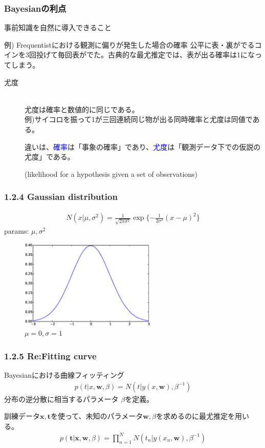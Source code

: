\documentclass[dvipdfmx]{beamer}
\theoremstyle{definition}
\begin{document}
\begin{frame}
  \frametitle{Bayesianの利点}
  事前知識を自然に導入できること

  \begin{block}{例) Frequentistにおける観測に偏りが発生した場合の確率}
    公平に表・裏がでるコインを3回投げて毎回表がでた。古典的な最尤推定では、表が出る確率は1になってしまう。
  \end{block}
  \begin{description}
    \item[尤度] \hfill \\
      尤度は確率と数値的に同じである。
      \\
      例)サイコロを振って1が三回連続同じ物が出る同時確率と尤度は同値である。
      
      違いは、\textcolor{blue}{確率}は「事象の確率」であり、\textcolor{blue}{尤度}は「観測データ下での仮説の尤度」である。

      (likelihood for a hypothesis given a set of observations)
  \end{description}
\end{frame}

\begin{frame}
  \frametitle{1.2.4 Gaussian distribution}
  \begin{gather*}
    N(x|\mu, \sigma^2) = \frac{1}{\sqrt{2\pi \sigma^2}}\exp\{-\frac{1}{2\sigma^2}(x-\mu)^2 \}
  \end{gather*}
  params: $\mu,\sigma^2$
  \begin{figure}[htb]
    \centering
    \includegraphics[width=6.5cm,clip]{res/gasussiandist.eps}
    \caption{$\mu =0,\sigma=1$}
  \end{figure}
\end{frame}

\begin{frame}
  \frametitle{1.2.5 Re:Fitting curve}
  Bayesianにおける曲線フィッティング
  \begin{gather*}
    p(t|x,\bm{w},\beta)=N(t|y(x,\bm{w}),\beta^{-1})
  \end{gather*}
  分布の逆分散に相当するパラメータ $\beta$を定義。
  
  訓練データ${\bm{x},\bm{t}}$を使って、未知のパラメータ$\bm{w},\beta$を求めるのに最尤推定を用いる。
  \begin{gather*}
    p(\bm{t}|\bm{x},\bm{w},\beta)=\prod_{n=1}^{N} N(t_n | y(x_n,\bm{w}),\beta^{-1})
  \end{gather*}
\end{frame}
\end{document}
